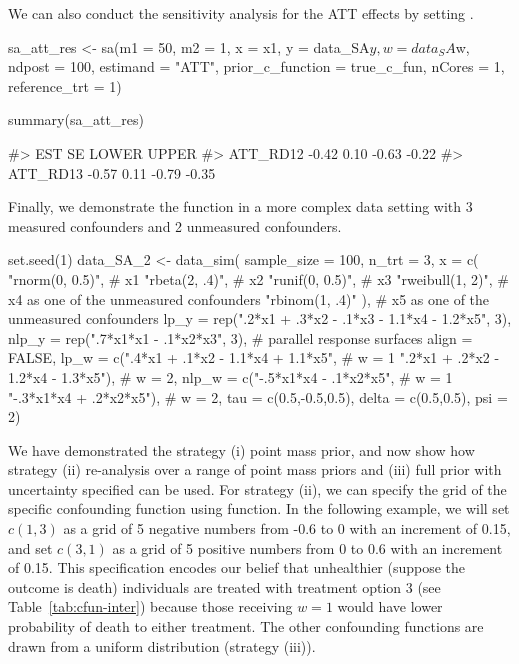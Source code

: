 We can also conduct the sensitivity analysis for the ATT effects by setting  . 

\begin{Schunk}
\begin{Sinput}
sa_att_res <- sa(m1 = 50, m2 = 1, x = x1, y = data_SA$y, w = data_SA$w, ndpost = 100,
                 estimand = "ATT", prior_c_function =  true_c_fun, nCores = 1, 
                 reference_trt = 1)
\end{Sinput}
\end{Schunk}

\begin{Schunk}
\begin{Sinput}
summary(sa_att_res)
\end{Sinput}
\begin{Soutput}
#>            EST   SE LOWER UPPER
#> ATT_RD12 -0.42 0.10 -0.63 -0.22
#> ATT_RD13 -0.57 0.11 -0.79 -0.35
\end{Soutput}
\end{Schunk}

Finally, we demonstrate the  function in a more complex data setting with 3 measured confounders and 2 unmeasured confounders.  

\begin{Schunk}
\begin{Sinput}
set.seed(1)
data_SA_2 <- data_sim(
  sample_size = 100, n_trt = 3,
  x = c( "rnorm(0, 0.5)",  # x1
         "rbeta(2, .4)",   # x2
         "runif(0, 0.5)",  # x3
         "rweibull(1, 2)", # x4 as one of the unmeasured confounders
         "rbinom(1, .4)" ),  # x5 as one of the unmeasured confounders
  lp_y = rep(".2*x1 + .3*x2 - .1*x3 - 1.1*x4 - 1.2*x5", 3),
  nlp_y  = rep(".7*x1*x1  - .1*x2*x3", 3), # parallel response surfaces
  align = FALSE,
  lp_w =  c(".4*x1 + .1*x2 - 1.1*x4 + 1.1*x5",  # w = 1
            ".2*x1 + .2*x2 - 1.2*x4 - 1.3*x5"), # w = 2,
  nlp_w = c("-.5*x1*x4 - .1*x2*x5",  # w = 1
            "-.3*x1*x4 + .2*x2*x5"), # w = 2,
  tau = c(0.5,-0.5,0.5), delta = c(0.5,0.5), psi = 2)
\end{Sinput}
\end{Schunk}

We have demonstrated the strategy (i) point mass prior, and now show how strategy (ii) re-analysis over a range of point mass priors and (iii) full prior with uncertainty specified can be used. For strategy (ii), we can specify the grid of the specific confounding function using  function. In the following example, we will set  $c(1,3)$  as a grid of 5 negative numbers from -0.6 to 0 with an increment of 0.15, and set  $c(3,1)$ as a grid of 5 positive numbers from  0 to 0.6 with an increment of 0.15. This specification encodes our belief that unhealthier (suppose the outcome is death) individuals are treated with treatment option 3 (see Table~\ref{tab:cfun-inter})  because those receiving $w=1$ would have lower probability of death to either treatment.  The other confounding functions are drawn from a uniform distribution (strategy (iii)).

